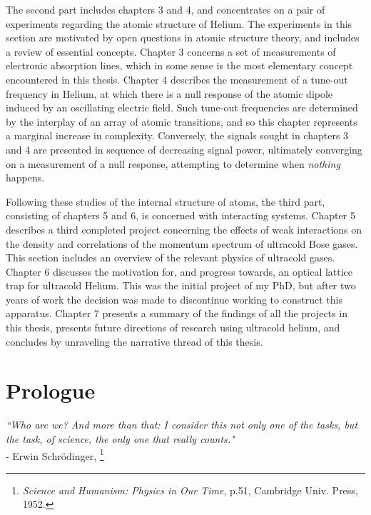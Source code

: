 The second part includes chapters 3 and 4, and concentrates on a pair of
experiments regarding the atomic structure of Helium. The experiments in
this section are motivated by open questions in atomic structure theory,
and includes a review of essential concepts. Chapter 3 concerns a set of
measurements of electronic absorption lines, which in some sense is the
most elementary concept encountered in this thesis. Chapter 4 describes
the measurement of a tune-out frequency in Helium, at which there is a
null response of the atomic dipole induced by an oscillating electric
field. Such tune-out frequencies are determined by the interplay of an
array of atomic transitions, and so this chapter represents a marginal
increase in complexity. Conversely, the signals sought in chapters 3 and
4 are presented in sequence of decreasing signal power, ultimately
converging on a measurement of a null response, attempting to determine
when \emph{nothing} happens.

Following these studies of the internal structure of atoms, the third
part, consisting of chapters 5 and 6, is concerned with interacting
systems. Chapter 5 describes a third completed project concerning the
effects of weak interactions on the density and correlations of the
momentum spectrum of ultracold Bose gases. This section includes an
overview of the relevant physics of ultracold gases. Chapter 6 discusses
the motivation for, and progress towards, an optical lattice trap for
ultracold Helium. This was the initial project of my PhD, but after two
years of work the decision was made to discontinue working to construct
this apparatus. Chapter 7 presents a summary of the findings of all the
projects in this thesis, presents future directions of research using
ultracold helium, and concludes by unraveling the narrative thread of
this thesis.

\section*{Prologue}\label{sec:prologue}


\begin{adjustwidth}{6cm}{0cm}
\begin{flushright}
\emph{``Who are we? And more than that: I consider this not only one of the tasks, but the task, of science, the only one that really counts."\\}
- Erwin Schr\"{o}dinger, \footnote{\emph{Science and Humanism: Physics in Our Time}, p.51, Cambridge Univ. Press, 1952.}\\
\end{flushright}
\end{adjustwidth}

